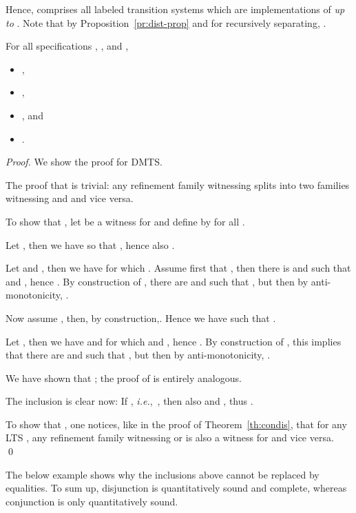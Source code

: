 \documentclass[twocolumn]{svjour3-dummy}
\newcommand*\ie{\textit{i.e.},}
\begin{document}
Hence,  comprises all labeled transition systems which
are implementations of  \emph{up to }.  Note that by
Proposition~\ref{pr:dist-prop} and for  recursively separating,
.

\begin{theorem}
  \label{th:condis-q}
  For all specifications , ,  and ,
  \begin{itemize}
  \item ,
  \item ,
  \item , and
  \item .
  \end{itemize}
\end{theorem}

\begin{proof}We show the proof for DMTS.

  The proof that   is trivial: any refinement family
  witnessing  splits into two families
  witnessing  and  and vice
  versa.

  To show that  , let  be a
  witness for  and define  by
   for all .

  Let , then we have  so that , hence also .

  Let  and , then we have
   for which .  Assume first
  that , then there is 
  and  such that 
  and , hence .  By construction of , there are
   and  such that , but then by anti-monotonicity, .

  Now assume , then, by
  construction,\linebreak[4] .  Hence we have  such that .

  Let , then we have  and
   for which  and
  , hence .  By
  construction of , this implies that there are 
  and  such that , but then by
  anti-monotonicity, .

  We have shown that ; the proof of  is entirely analogous.

  The inclusion  is clear now: If , \ie~, then also  and , thus .

  To show that , one notices, like in the proof of
  Theorem~\ref{th:condis}, that for any LTS , any refinement family
  witnessing  or  is also a
  witness for  and vice versa. \qed
\end{proof}

The below example shows why the inclusions above cannot be replaced by
equalities.  To sum up, disjunction is quantitatively sound and
complete, whereas conjunction is only quantitatively sound.
\end{document}
